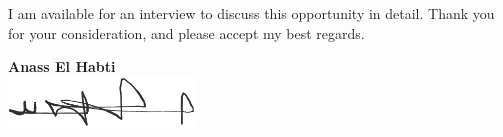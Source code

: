 \documentclass[a4paper,11pt]{letter}
\begin{document}
I am available for an interview to discuss this opportunity in detail. Thank you for your consideration, and please accept my best regards.

\vspace*{3cm} %

\begin{minipage}{\textwidth}
    \raggedleft
    \textbf{Anass El Habti} \\ %
    \includegraphics[width=5cm]{signature_pandadoc.png} %
\end{minipage}
\end{document}
